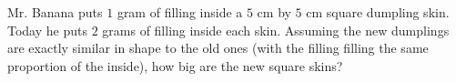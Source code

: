 Mr. Banana puts $1$ gram of filling inside a $5$ cm by $5$ cm square dumpling skin. Today he puts $2$ grams of filling inside each skin. Assuming the new dumplings are exactly similar in shape to the old ones (with the filling filling the same proportion of the inside), how big are the new square skins?
